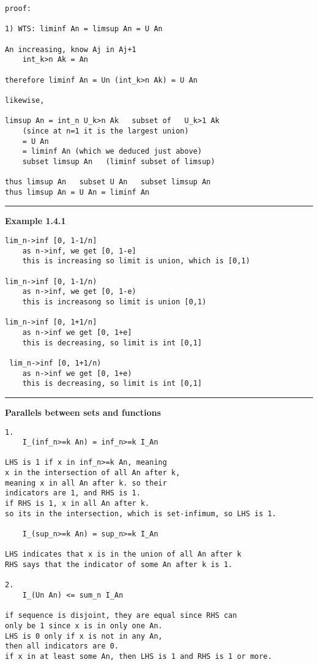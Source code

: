 \documentclass{article}
\begin{document}
\begin{flushleft}
\begin{verbatim}
proof:

1) WTS: liminf An = limsup An = U An

An increasing, know Aj in Aj+1
    int_k>n Ak = An

therefore liminf An = Un (int_k>n Ak) = U An

likewise,

limsup An = int_n U_k>n Ak   subset of   U_k>1 Ak 
    (since at n=1 it is the largest union)
    = U An   
    = liminf An (which we deduced just above)
    subset limsup An   (liminf subset of limsup)

thus limsup An   subset U An   subset limsup An
thus limsup An = U An = liminf An

\end{verbatim}

\bigbreak
\hrule
\bigbreak
\textbf{Example 1.4.1}

\begin{verbatim}
lim_n->inf [0, 1-1/n] 
    as n->inf, we get [0, 1-e]
    this is increasing so limit is union, which is [0,1)
	
lim_n->inf [0, 1-1/n)
    as n->inf, we get [0, 1-e)
    this is increasong so limit is union [0,1)
	
lim_n->inf [0, 1+1/n]
    as n->inf we get [0, 1+e]
    this is decreasing, so limit is int [0,1]
	
 lim_n->inf [0, 1+1/n)
    as n->inf we get [0, 1+e)
    this is decreasing, so limit is int [0,1]

\end{verbatim}

\bigbreak
\hrule
\bigbreak
\textbf{Parallels between sets and functions}

\begin{verbatim}
1. 
    I_(inf_n>=k An) = inf_n>=k I_An

LHS is 1 if x in inf_n>=k An, meaning 
x in the intersection of all An after k,
meaning x in all An after k. so their 
indicators are 1, and RHS is 1. 
if RHS is 1, x in all An after k.
so its in the intersection, which is set-infimum, so LHS is 1.

    I_(sup_n>=k An) = sup_n>=k I_An 

LHS indicates that x is in the union of all An after k
RHS says that the indicator of some An after k is 1. 

2. 
    I_(Un An) <= sum_n I_An

if sequence is disjoint, they are equal since RHS can 
only be 1 since x is in only one An.
LHS is 0 only if x is not in any An, 
then all indicators are 0. 
if x in at least some An, then LHS is 1 and RHS is 1 or more.


\end{verbatim}
\end{flushleft}
\end{document}
